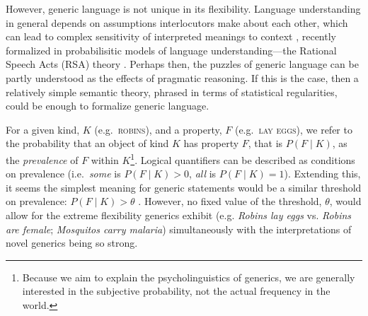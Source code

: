 \documentclass[10pt,letterpaper]{article}
\begin{document}
However, generic language is not unique in its flexibility.
Language understanding in general depends on assumptions interlocutors make about each other, which can lead to complex sensitivity of interpreted meanings to context \cite{Clark1996, Grice1975, Levinson2000}, recently formalized in probabilisitic models of language understanding---the Rational Speech Acts (RSA) theory \cite{Frank2012, Goodman2013, Franke2009}. 
Perhaps then, the puzzles of generic language can be partly understood as the effects of pragmatic reasoning.
If this is the case, then a relatively simple semantic theory, phrased in terms of statistical regularities, could be enough to formalize generic language.



For a given kind, $K$ (e.g.~\textsc{robins}), and a property, $F$ (e.g.~\textsc{lay eggs}), we refer to the probability that an object of kind $K$ has property $F$, that is $P(F\mid K)$, as the \emph{prevalence} of $F$ within $K$\footnote{Because we aim to explain the psycholinguistics of generics, we are generally interested in the subjective probability, not the actual frequency in the world.}.
Logical quantifiers can be described as conditions on prevalence (i.e.~\emph{some} is $P(F\mid K)>0$, \emph{all} is $P(F\mid K)=1$). 
Extending this, it seems the simplest meaning for generic statements would be a similar threshold on prevalence: $P(F\mid K)>\theta$ \cite{Cohen1999}. 
However, no fixed value of the threshold, $\theta$, would allow for the extreme flexibility generics exhibit (e.g. \emph{Robins lay eggs} vs. \emph{Robins are female}; \emph{Mosquitos carry malaria}) simultaneously with the interpretations of novel generics being so strong. 
\end{document}
